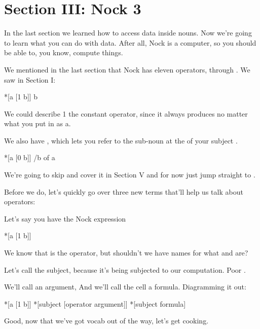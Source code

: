 \section{Section III: Nock 3}

In the last section we learned how to access data inside nouns. Now we're going
to learn what you can do with data. After all, Nock is a computer, so you
should be able to, you know, compute things.

We mentioned in the last section that Nock has eleven operators,  through
. We saw  in Section I:
\begin{code}
*[a [1 b]]                  b
\end{code}
We could describe 1 the constant operator, since it always produces 
no matter what you put in as a.

We also have , which lets you refer to the sub-noun at the  of
your subject . 
\begin{code}
*[a [0 b]]               /b of a
\end{code}
We're going to skip  and cover it in Section V and for now just jump
straight to .

Before we do, let's quickly go over three new terms that'll help us talk about
operators:

Let's say you have the Nock expression 
\begin{code}
*[a [1 b]] 
\end{code}
We know that  is the operator, but shouldn't we have names for what  and
 are?

Let's call  the subject, because it's being subjected to our computation.
Poor .

We'll call  an argument, And we'll call the cell \kode{[1 b]} a formula.
Diagramming it out:
\begin{code}
*[a [1 b]] 
*[subject [operator argument]]
*[subject formula]
\end{code}
Good, now that we've got vocab out of the way, let's get cooking.

